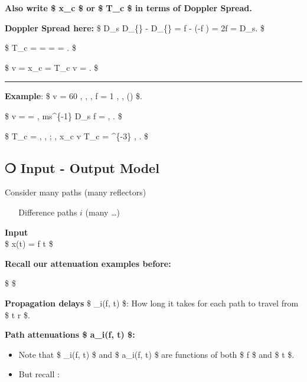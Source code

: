 \documentclass[11pt]{article}
\providecommand{\tightlist}{%
      \setlength{\itemsep}{0pt}\setlength{\parskip}{0pt}}
\begin{document}
{    \textbf{Also write \$ \Delta x\_c \$ or \$ T\_c \$ in terms of Doppler
Spread.}

\textbf{Doppler Spread here:} \$ D\_s \triangleq D\_\{\} -
D\_\{\} = f  - (-f ) = 2f  =
D\_s. \$

\$ T\_c =  =   = 
 = . \$

\$ v =  \qquad \Delta x\_c = T\_c \cdot v =
. \$

\begin{center}\rule{0.5\linewidth}{0.5pt}\end{center}

    \textbf{Example}: \$ v = 60 , , , f = 1 ,  ,
() \$.

\$ v =  =  ,
ms\^{}\{-1\} \Rightarrow D\_s  \cdot f \cdot {} =
\approx {}  , . \$

\$ \Rightarrow T\_c \approx {} =  ,
  , ; , \Delta x\_c \approx v \cdot T\_c =
  \^{}\{-3\}  , 
\approx {}. \$

    \subsection{❍ Input - Output Model}\label{input---output-model}

    Consider many paths (many reflectors)

~ ~ Difference paths \(i\) (many \ldots)

\textbf{Input}\\
\$ x(t) = \pi f t \$

\textbf{Recall our attenuation examples before:}

\$  \$

\textbf{Propagation delays} \$ \tau\_i(f, t) \$: How long it takes for
each path to travel from \$ t \to r \$.

    \textbf{Path attenuations \$ a\_i(f, t) \$:}

\begin{itemize}
\tightlist
\item
  Note that \$ \tau\_i(f, t) \$ and \$ a\_i(f, t) \$ are functions of
  both \$ f \$ and \$ t \$.\\
\item
  But recall :
\end{itemize}

}
\end{document}
